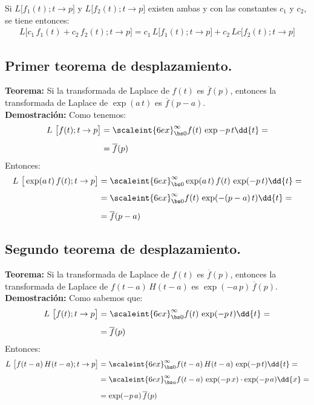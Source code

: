 Si $L \big[  f_{1} (t); t \to p  \big]$ y $L \big[  f_{2} (t); t \to p  \big]$ existen ambas y con las constantes $c_{1}$ y $c_{2}$, se tiene entonces:
\begin{align*}
L \big[  c_{1} \, f_{1} (t) + c_{2} \, f_{2} (t) ; t \to p  \big] = c_{1} \, L \big[  f_{1} (t); t \to p  \big] + c_{2} \, L c \big[  f_{2} (t); t \to p  \big]
\end{align*}

\subsection{Primer teorema de desplazamiento.}

\noindent \textbf{Teorema: } Si la transformada de Laplace de $f (t)$ es $\overline{f} (p)$, entonces la transformada de Laplace de $\exp(a \, t)$ es $\overline{f} (p - a)$.
\\[0.5em]
\textbf{Demostración: } Como tenemos:
\begin{align*}
L \big[  f (t); t \to p  \big] &= \scaleint{6ex}_{\bs 0}^{\infty} f (t) \, \exp{-p \, t} \dd{t} = \\[0.5em]
&= \overline{f} (p)
\end{align*}
Entonces:
\begin{align}
\begin{aligned}[b]
L \big[  \exp (a \, t) \, f (t); t \to p  \big] &= \scaleint{6ex}_{\bs 0}^{\infty} \exp(a \, t) \, f (t) \, \exp (-p \, t) \dd{t} = \\[0.5em]
&= \scaleint{6ex}_{\bs 0}^{\infty} f (t) \, \exp(-(p - a) \, t) \dd{t} = \\[0.5em]
&= \overline{f} (p - a)
\end{aligned}
\label{eq:ecuacion_03_07}
\end{align}

\subsection{Segundo teorema de desplazamiento.}

\noindent \textbf{Teorema: } Si la transformada de Laplace de $f (t)$ es $\overline{f} (p)$, entonces la transformada de Laplace de $f (t - a) \, H (t - a)$ es $\exp(-a \, p) \, \overline{f} (p)$.
\\[0.5em]
\textbf{Demostración: } 
Como sabemos que:
\begin{align*}
L \big[  f (t); t \to p  \big] &= \scaleint{6ex}_{\bs 0}^{\infty} f (t) \, \exp(-p \, t) \dd{t} = \\[0.5em]
&= \overline{f} (p)
\end{align*}
Entonces:
\begin{align}
\begin{aligned}
L \big[  f (t - a) \, H (t - a); t \to p  \big] &= \scaleint{6ex}_{\bs 0}^{\infty} f (t - a) \, H (t - a) \, \exp(-p \, t) \dd{t} = \\[0.5em]
&= \scaleint{6ex}_{\bs a}^{\infty} f (t - a) \, \exp(-p \, x) \cdot \exp(-p \, a) \dd{x} = \\[0.5em]
&= \exp(-p \, a) \, \overline{f} (p) 
\end{aligned}
\label{eq:ecuacion_03_08}
\end{align}

